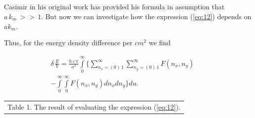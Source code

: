 \documentclass[twoside, 10pt, ptm]{article}
\def\myvspacebeforesubsection{-2.0mm}
\def\myvspaceaftersubsection{-2.5mm}
\begin{document}
\begin{multicols}{2}


\vspace{\myvspacebeforesubsection}
    \subsection*{}\label{how-deltaleftevright-depends-on-a-k_m}
\vspace{\myvspaceaftersubsection}


    Casimir in his original work \cite{Casimir1948} has provided his formula in assumption that
\(a\,k_m\,>>\,1\). But now we can investigate how the expression (\ref{eq:12}) depends on \(a k_m\).


    Thus, for the energy density difference per \(cm^2\) we find

\vspace{-3.5mm}
\begin{equation}
\begin{array}{r}
    \delta\,\frac{E}{V} = \frac{\hbar\,c\,\pi}{a^4} \int\limits_{0}^{\infty} \Bigg\{ \sum\limits_{n_x=\left(0\right)\,1}^{\infty} \sum\limits_{n_y=\left(0\right)\,1}^{\infty} F\left(n_x, n_y\right) \,\,\,\,\,\,\,\,\,\,\\ 
- \int\limits_{0}^{\infty} \int\limits_{0}^{\infty} F\left(n_x, n_y\right) d{n_x} d{n_y} \Bigg\} d{u}.
\end{array}
\end{equation}

\vspace{-3.5mm}

\noindent
\begin{center}
\begin{tabular}{ r }
Table 1. The result of evaluating the expression (\ref{eq:12}).
\end{tabular}

\vspace{+3.5mm}


\end{center}
\end{multicols}
\end{document}
